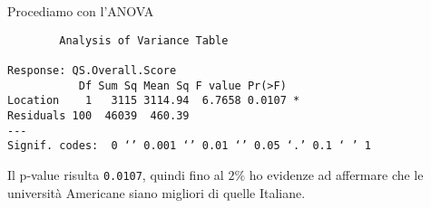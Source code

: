 \documentclass{beamer}
\begin{document}
\begin{frame}[fragile]
    Procediamo con l'ANOVA
    {\tiny
    \begin{verbatim}
        Analysis of Variance Table

Response: QS.Overall.Score
           Df Sum Sq Mean Sq F value Pr(>F)  
Location    1   3115 3114.94  6.7658 0.0107 *
Residuals 100  46039  460.39                 
---
Signif. codes:  0 ‘’ 0.001 ‘’ 0.01 ‘’ 0.05 ‘.’ 0.1 ‘ ’ 1

    \end{verbatim}
    }
    Il p-value risulta \texttt{0.0107}, quindi fino al $2\%$ ho evidenze ad affermare che le università Americane siano migliori di quelle Italiane.
\end{frame}
\end{document}
